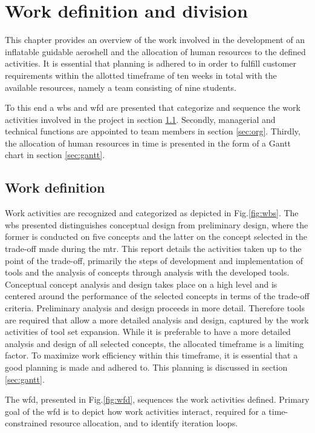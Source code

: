 \section{Work definition and division}
\label{ch:wdd}
This chapter provides an overview of the work involved in the development of an inflatable guidable aeroshell and the allocation of human resources to the defined activities. It is essential that planning is adhered to in order to fulfill customer requirements within the allotted timeframe of ten weeks in total with the available resources, namely a team consisting of nine students. 

To this end a \gls{wbs} and \gls{wfd} are presented that categorize and sequence the work activities involved in the project in section \ref{sec:work}. Secondly, managerial and technical functions are appointed to team members in section \ref{sec:org}. Thirdly, the allocation of human resources in time is presented in the form of a Gantt chart in section \ref{sec:gantt}.

\subsection{Work definition}
\label{sec:work}
Work activities are recognized and categorized as depicted in Fig.\ref{fig:wbs}. The \gls{wbs} presented distinguishes conceptual design from preliminary design, where the former is conducted on five concepts and the latter on the concept selected in the trade-off made during the \acrfull{mtr}. This report details the activities taken up to the point of the trade-off, primarily the steps of development and implementation of tools and the analysis of concepts through analysis with the developed tools. Conceptual concept analysis and design takes place on a high level and is centered around the performance of the selected concepts in terms of the trade-off criteria. Preliminary analysis and design proceeds in more detail. Therefore tools are required that allow a more detailed analysis and design, captured by the work activities of tool set expansion. While it is preferable to have a more detailed analysis and design of all selected concepts, the allocated timeframe is a limiting factor. To maximize work efficiency within this timeframe, it is essential that a good planning is made and adhered to. This planning is discussed in section \ref{sec:gantt}.

The \gls{wfd}, presented in Fig.\ref{fig:wfd}, sequences the work activities defined. Primary goal of the \gls{wfd} is to depict how work activities interact, required for a time-constrained resource allocation, and to identify iteration loops.

